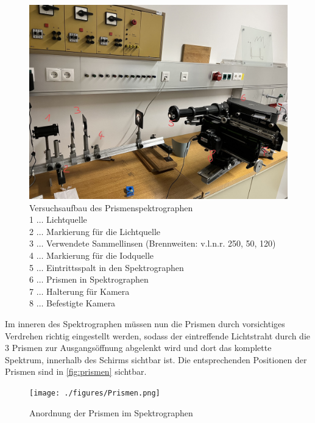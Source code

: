 \documentclass[12pt,english,ngerman]{scrartcl}
\begin{document}
\begin{figure}[H]
	\begin{center}
		\includegraphics[width =\textwidth]{./figures/Spektograph.png}
	\end{center}
	\caption[Versuchsaufbau des Prismenspektrographen]
	{Versuchsaufbau des Prismenspektrographen \\
	1 \(\dots\) Lichtquelle \\
	2 \(\dots\) Markierung für die Lichtquelle \\
	3 \(\dots\) Verwendete Sammellinsen (Brennweiten: v.l.n.r. 250, 50, 120) \\
	4 \(\dots\) Markierung für die Iodquelle \\
	5 \(\dots\) Eintrittsspalt in den Spektrographen \\
	6 \(\dots\) Prismen in Spektrographen \\
	7 \(\dots\) Halterung für Kamera \\
	8 \(\dots\) Befestigte Kamera
	}\label{fig:aufbau_Spektograph}
\end{figure}

Im inneren des Spektrographen müssen nun die Prismen durch vorsichtiges Verdrehen richtig eingestellt werden, sodass der 
eintreffende Lichtstraht durch die 3 Prismen zur Ausgangsöffnung abgelenkt wird und dort das komplette Spektrum, innerhalb
des Schirms sichtbar ist. Die entsprechenden Positionen der Prismen sind in \autoref{fig:prismen} sichtbar.

\begin{figure}[H]
	\begin{center}
		\texttt{[image: ./figures/Prismen.png]}
	\end{center}
	\caption[Anordnung der Prismen im Spektrographen]
	{Anordnung der Prismen im Spektrographen
	}\label{fig:prismen}
\end{figure}
\end{document}
